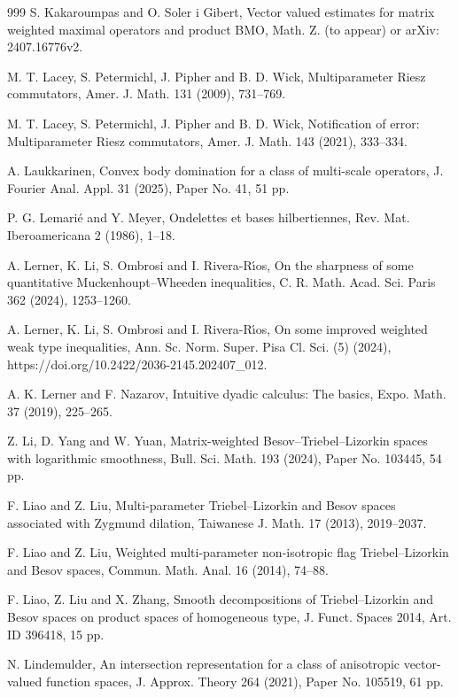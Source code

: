 \documentclass[11pt, reqno]{amsart}
\theoremstyle{definition}
\theoremstyle{remark}
\numberwithin{equation}{section}
\begin{document}
\begin{thebibliography}{999}
S. Kakaroumpas and O. Soler i Gibert,
Vector valued estimates for matrix weighted maximal operators and product BMO,
Math. Z. (to appear) or arXiv: 2407.16776v2.

M. T. Lacey, S. Petermichl, J. Pipher and B. D. Wick,
Multiparameter Riesz commutators,
Amer. J. Math. 131 (2009), 731--769.

M. T. Lacey, S. Petermichl, J. Pipher and B. D. Wick,
Notification of error: Multiparameter Riesz commutators,
Amer. J. Math. 143 (2021), 333--334.

A. Laukkarinen,
Convex body domination for a class of multi-scale operators,
J. Fourier Anal. Appl. 31 (2025), Paper No. 41, 51 pp.

P. G. Lemari\'e and Y. Meyer,
Ondelettes et bases hilbertiennes,
Rev. Mat. Iberoamericana 2 (1986), 1--18.

A. Lerner, K. Li, S. Ombrosi and I. Rivera-R\'{\i}os,
On the sharpness of some quantitative
Muckenhoupt--Wheeden inequalities,
C. R. Math. Acad. Sci. Paris 362 (2024), 1253--1260.

A. Lerner, K. Li, S. Ombrosi and I. Rivera-R\'{\i}os,
On some improved weighted weak type inequalities,
Ann. Sc. Norm.
Super. Pisa Cl. Sci. (5) (2024),
https://doi.org/10.2422/2036-2145.202407\_012.

A. K. Lerner and F. Nazarov,
Intuitive dyadic calculus: The basics,
Expo. Math. 37 (2019), 225--265.

Z. Li, D. Yang and W. Yuan,
Matrix-weighted Besov--Triebel--Lizorkin spaces with logarithmic smoothness,
Bull. Sci. Math. 193 (2024), Paper No. 103445, 54 pp.

F. Liao and Z. Liu,
Multi-parameter Triebel--Lizorkin and Besov spaces associated with Zygmund dilation,
Taiwanese J. Math. 17 (2013), 2019--2037.

F. Liao and Z. Liu,
Weighted multi-parameter non-isotropic flag Triebel--Lizorkin and Besov spaces,
Commun. Math. Anal. 16 (2014), 74--88.

F. Liao, Z. Liu and X. Zhang,
Smooth decompositions of Triebel--Lizorkin and Besov spaces on product spaces of homogeneous type,
J. Funct. Spaces 2014, Art. ID 396418, 15 pp.

N. Lindemulder,
An intersection representation for a class of anisotropic vector-valued function spaces,
J. Approx. Theory 264 (2021), Paper No. 105519, 61 pp.


\end{thebibliography}
\end{document}
